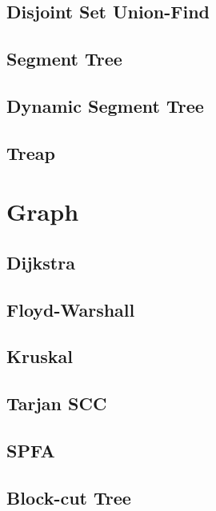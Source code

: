 \documentclass[twocolumn]{article}
\begin{document}
\subsection{Disjoint Set Union-Find}


\subsection{Segment Tree}


\subsection{Dynamic Segment Tree}


\subsection{Treap}


\section{Graph}

\subsection{Dijkstra}


\subsection{Floyd-Warshall}


\subsection{Kruskal}


\subsection{Tarjan SCC}


\subsection{SPFA}


\subsection{Block-cut Tree}

\end{document}
